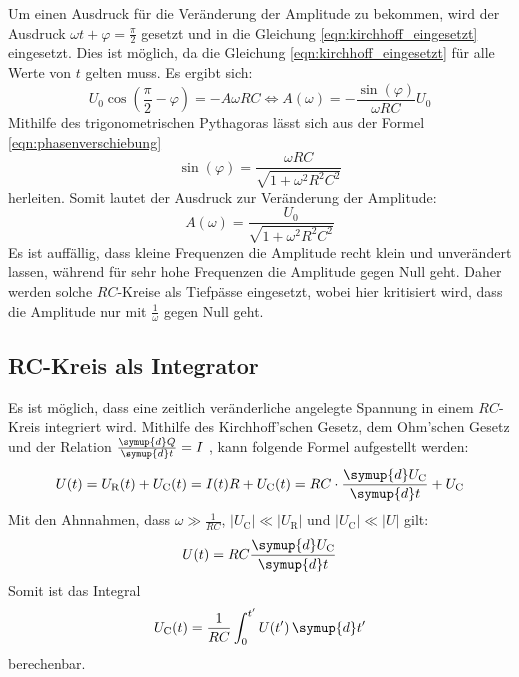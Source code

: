     \noindent Um einen Ausdruck für die Veränderung der Amplitude zu bekommen, wird der Ausdruck $\omega t + \varphi = \frac{\pi}{2}$ gesetzt und in die Gleichung
    \eqref{eqn:kirchhoff_eingesetzt} eingesetzt. Dies ist möglich, da die Gleichung \eqref{eqn:kirchhoff_eingesetzt} für alle Werte von $t$ gelten muss.
    Es ergibt sich:
    \begin{equation}
        \label{eqn:AufgabeD}
        U_0 \cos(\frac{\pi}{2} - \varphi) = -A \omega RC  \iff A(\omega) = - \frac{\sin(\varphi)}{\omega RC }U_0
    \end{equation}
    Mithilfe des trigonometrischen Pythagoras lässt sich aus der Formel \eqref{eqn:phasenverschiebung} 
    \begin{equation*}
        \sin(\varphi) = \frac{\omega RC}{\sqrt{1 + \omega^2 R^2 C^2}}
    \end{equation*}
    herleiten. Somit lautet der Ausdruck zur Veränderung der Amplitude:
    \begin{equation} \label{eqn:amplitude}
        A(\omega) = \frac{U_0}{\sqrt{1 + \omega^2 R^2 C^2}}
    \end{equation}
    Es ist auffällig, dass kleine Frequenzen die Amplitude recht klein und unverändert lassen, während für sehr hohe Frequenzen die Amplitude gegen Null geht. 
    Daher werden solche $RC$-Kreise als Tiefpässe eingesetzt, wobei hier kritisiert wird, dass die Amplitude nur mit $\frac{1}{ \omega}$ gegen Null geht.


\subsection{RC-Kreis als Integrator}

    Es ist möglich, dass eine zeitlich veränderliche angelegte Spannung in einem $RC$-Kreis integriert wird. Mithilfe des Kirchhoff'schen Gesetz, dem Ohm'schen 
    Gesetz und der Relation $\frac{\symup{d}Q}{\symup{d}t} = I$ , kann folgende Formel aufgestellt werden:
    \begin{equation*}
        U(t) = U_{\text{R}}(t) + U_{\text{C}}(t) = I(t)R + U_{\text{C}}(t) = RC \cdot \frac{\symup{d}U_{\text{C}}}{\symup{d}t} + U_{\text{C}} 
    \end{equation*}
    Mit den Ahnnahmen, dass $\omega \gg \frac{1}{RC}$, $|U_{\text{C}}| \ll |U_{\text{R}}|$ und $|U_{\text{C}}| \ll |U| $ gilt:
    \begin{equation*}
        U(t) = RC \frac{\symup{d}U_{\text{C}}}{\symup{d}t}
    \end{equation*}
    Somit ist das Integral 
    \begin{equation*}
        U_{\text{C}} (t) = \frac{1}{RC} \int_0^{t'} U(t') \, \symup{d}t'
    \end{equation*}
    berechenbar. 